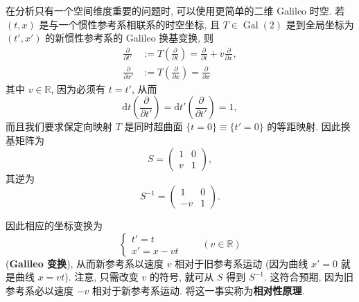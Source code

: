 在分析只有一个空间维度重要的问题时, 可以使用更简单的二维 Galileo 时空. 若 $(t,x)$ 是与一个惯性参考系相联系的时空坐标, 且 $T\in\operatorname{Gal}(2)$ 是到全局坐标为 $(t',x')$ 的新惯性参考系的 Galileo 换基变换, 则
\begin{align*}
  \frac{\partial}{\partial t'}&:=T\left(\frac{\partial}{\partial t}\right)
  =\frac{\partial}{\partial t}+v\frac{\partial}{\partial x},\\
  \frac{\partial}{\partial x'}&:=T\left(\frac{\partial}{\partial x}\right)
  =\frac{\partial}{\partial x}
\end{align*}
其中 $v\in\mathbb{R}$, 因为必须有 $t=t'$, 从而
\[
  \mathrm{d}t\left(\frac{\partial}{\partial t'}\right)
  =\mathrm{d}t'\left(\frac{\partial}{\partial t'}\right)=1,
\]
而且我们要求保定向映射 $T$ 是同时超曲面 $\{t=0\}\equiv\{t'=0\}$ 的等距映射. 因此换基矩阵为
\[
  S=\begin{pmatrix}1&0\\v&1\end{pmatrix},
\]
其逆为
\[
  S^{-1}=\begin{pmatrix}1&0\\-v&1\end{pmatrix}.
\]

因此相应的坐标变换为
\[
  \begin{cases}
    t'=t\\
    x'=x-vt
  \end{cases}
  \qquad(v\in\mathbb{R})
\]
(\textbf{Galileo 变换}), 从而新参考系以速度 $v$ 相对于旧参考系运动 (因为曲线 $x'=0$ 就是曲线 $x=vt$). 注意, 只需改变 $v$ 的符号, 就可从 $S$ 得到 $S^{-1}$. 这符合预期, 因为旧参考系必以速度 $-v$ 相对于新参考系运动. 将这一事实称为\textbf{相对性原理}.

